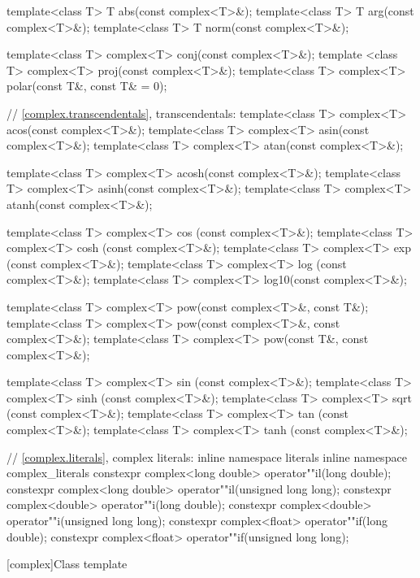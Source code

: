 \begin{codeblock}
{  template<class T> T abs(const complex<T>&);
  template<class T> T arg(const complex<T>&);
  template<class T> T norm(const complex<T>&);

  template<class T> complex<T> conj(const complex<T>&);
  template <class T> complex<T> proj(const complex<T>&);
  template<class T> complex<T> polar(const T&, const T& = 0);

  // \ref{complex.transcendentals}, transcendentals:
  template<class T> complex<T> acos(const complex<T>&);
  template<class T> complex<T> asin(const complex<T>&);
  template<class T> complex<T> atan(const complex<T>&);

  template<class T> complex<T> acosh(const complex<T>&);
  template<class T> complex<T> asinh(const complex<T>&);
  template<class T> complex<T> atanh(const complex<T>&);

  template<class T> complex<T> cos  (const complex<T>&);
  template<class T> complex<T> cosh (const complex<T>&);
  template<class T> complex<T> exp  (const complex<T>&);
  template<class T> complex<T> log  (const complex<T>&);
  template<class T> complex<T> log10(const complex<T>&);

  template<class T> complex<T> pow(const complex<T>&, const T&);
  template<class T> complex<T> pow(const complex<T>&, const complex<T>&);
  template<class T> complex<T> pow(const T&, const complex<T>&);

  template<class T> complex<T> sin  (const complex<T>&);
  template<class T> complex<T> sinh (const complex<T>&);
  template<class T> complex<T> sqrt (const complex<T>&);
  template<class T> complex<T> tan  (const complex<T>&);
  template<class T> complex<T> tanh (const complex<T>&);

  // \ref{complex.literals}, complex literals:
  inline namespace literals {
    inline namespace complex_literals {
      constexpr complex<long double> operator""il(long double);
      constexpr complex<long double> operator""il(unsigned long long);
      constexpr complex<double> operator""i(long double);
      constexpr complex<double> operator""i(unsigned long long);
      constexpr complex<float> operator""if(long double);
      constexpr complex<float> operator""if(unsigned long long);
    }
  }
}
\end{codeblock}

[complex]{Class template }

